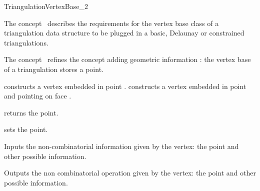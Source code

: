 

\begin{ccRefConcept}{TriangulationVertexBase_2}


\ccDefinition
  
The concept \ccRefName\ describes the requirements for the
vertex base class of a triangulation data structure
to be plugged in a basic, Delaunay or constrained
triangulations.

The concept \ccRefName\ refines the concept
adding geometric information :
the vertex base of a triangulation stores a point.


\ccCreation
{}  %


{constructs a vertex embedded in point .}
{constructs a vertex embedded in point and pointing on face .}

\ccAccessFunctions
{}
{returns  the point.}
\ccGlue
{}

{sets the point.}


{Inputs the non-combinatorial information given by the vertex: 
the point and other possible information.}

{Outputs the non combinatorial operation given by the vertex: the
point and other possible information.}





\end{ccRefConcept}
